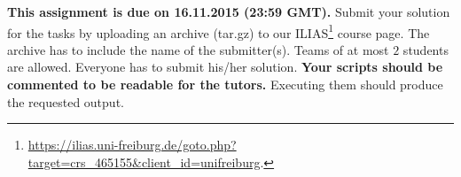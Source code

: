 \documentclass{exam}
\begin{document}
\noindent
{\bf This assignment is due on 16.11.2015 (23:59 GMT).} Submit your solution for the tasks by uploading an archive (tar.gz) to our ILIAS\footnote{ \url{https://ilias.uni-freiburg.de/goto.php?target=crs_465155&client_id=unifreiburg}.} course page. The archive has to include the name of the submitter(s). Teams of at most $2$ students are allowed. Everyone has to submit his/her solution.  \textbf{Your scripts should be commented to be readable for the tutors.} Executing them should produce the requested output.
\end{document}
